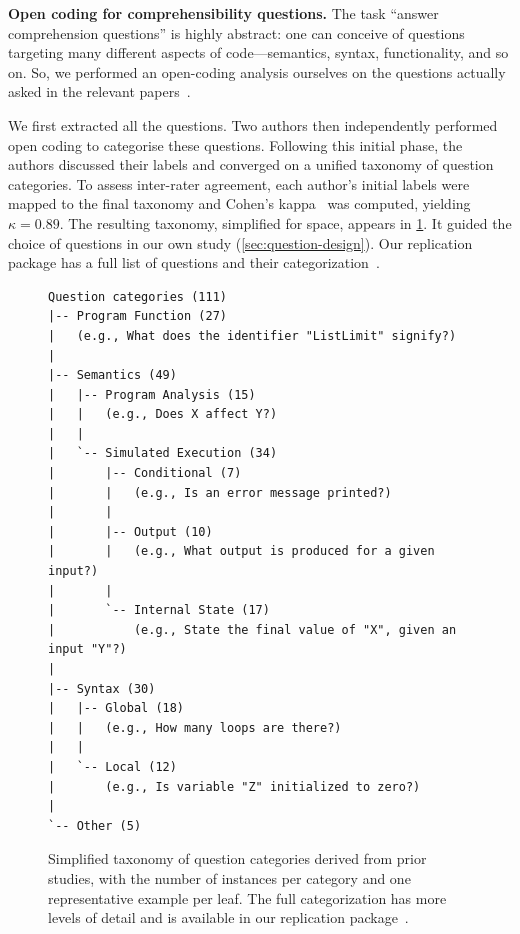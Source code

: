 \textbf{Open coding for comprehensibility questions.}
\label{sec:open-coding}
The task ``answer comprehension questions'' is highly abstract: one can conceive of questions 
targeting many different aspects of code---semantics, syntax, functionality, and so on.
So, we performed an open-coding analysis ourselves on the questions actually asked in the relevant papers~\cite{Scalabrino:TSE19,33-2,33-3,33-4,33-5,S34,33-7,33-8,33-9,penningtonModel, 33-11,33-12,33-13,33-14,33-15,33-16,33-17,33-18,33-19,33-20,33-21,33-22,33-23,33-24,33-25,33-26,33-27,33-28,33-29,33-30,33-31,33-32,33-33}. 


We first extracted all the questions. Two authors then 
independently performed open coding to categorise these questions. Following 
this initial phase, the authors discussed their labels and converged on a unified 
taxonomy of question categories. To assess inter-rater agreement, each author's 
initial labels were mapped to the final taxonomy and Cohen's kappa~\cite{cohen} was computed, 
yielding $\kappa = 0.89$. The resulting taxonomy, simplified for space, appears in \cref{fig:taxonomy_text}.
It guided the choice of questions in our own study (\cref{sec:question-design}).
Our replication package has a full list of questions and their categorization~\cite{replication-package}.

\begin{figure}[t]
\centering
\scriptsize
\begin{minipage}{0.95\linewidth}
\begin{verbatim}
Question categories (111)
|-- Program Function (27)
|   (e.g., What does the identifier "ListLimit" signify?)
|   
|-- Semantics (49)
|   |-- Program Analysis (15)
|   |   (e.g., Does X affect Y?)
|   |
|   `-- Simulated Execution (34)
|       |-- Conditional (7)
|       |   (e.g., Is an error message printed?)
|       |
|       |-- Output (10)
|       |   (e.g., What output is produced for a given input?)
|       |
|       `-- Internal State (17)
|           (e.g., State the final value of "X", given an input "Y"?)
|          
|-- Syntax (30)
|   |-- Global (18)
|   |   (e.g., How many loops are there?)
|   |
|   `-- Local (12)
|       (e.g., Is variable "Z" initialized to zero?)
|
`-- Other (5)
\end{verbatim}
\end{minipage}
\caption{Simplified taxonomy of question categories derived from prior studies, with the number of instances per category and one representative example per leaf.
The full categorization has more levels of detail and is available in our replication package~\cite{replication-package}.
}
\label{fig:taxonomy_text}
\end{figure}

